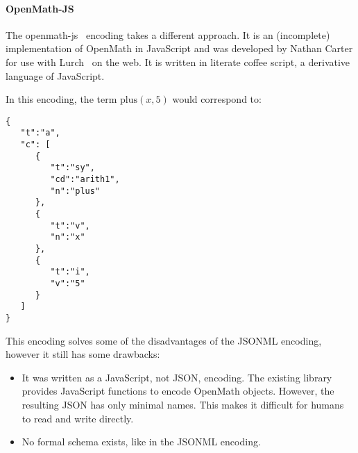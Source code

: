 \paragraph{OpenMath-JS}
The openmath-js~\cite{openmathjs:webpage} encoding takes a different approach. 
It is an (incomplete) implementation of OpenMath in JavaScript and was developed by Nathan Carter for use with Lurch~\cite{CarterMonks:OM:CICM-WS-WiP2013} on the web. 
It is written in literate coffee script, a derivative language of JavaScript. 

In this encoding, the term $\mathrm{plus}(x, 5)$ would correspond to: 
\begin{lstlisting}
{  
   "t":"a",
   "c": [  
      {  
         "t":"sy",
         "cd":"arith1",
         "n":"plus"
      },
      {  
         "t":"v",
         "n":"x"
      },
      {  
         "t":"i",
         "v":"5"
      }
   ]
}
\end{lstlisting}

This encoding solves some of the disadvantages of the JSONML encoding, however it still has some drawbacks:

\begin{itemize}
\item It was written as a JavaScript, not JSON, encoding. 
    The existing library provides JavaScript functions to encode OpenMath objects. 
    However, the resulting JSON has only minimal names. 
    This makes it difficult for humans to read and write directly.
\item No formal schema exists, like in the JSONML encoding.
\end{itemize}


